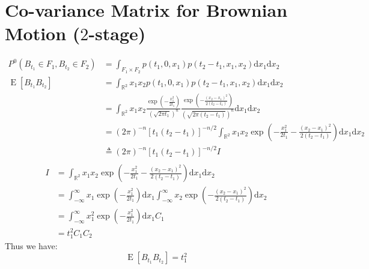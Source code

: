\documentclass[12pt]{article}
\begin{document}
\section{Co-variance Matrix for Brownian Motion ($2$-stage)}
\begin{align*}
    P^0(B_{t_1} \in F_1, B_{t_2} \in F_2) & =  \int_{F_1 \times F_2} p(t_1, 0, x_1) p(t_2-t_1, x_1, x_2) \mathrm{d}x_{1} \mathrm{d}x_2 \\
    \operatorname{E}[B_{t_1} B_{t_2}]     & =  \int_{\mathbb{R}^2} x_1 x_2 p(t_1, 0, x_1) p(t_2-t_1, x_1, x_2) \mathrm{d}x_{1} \mathrm{d}x_2 \\
    &= \int_{\mathbb{R}^2} x_1 x_2 \frac{\exp \left(-\frac{x_1^2}{2 t_1}\right)}{(\sqrt{2 \pi t_1})^{n} } \frac{\exp \left(-\frac{(x_2-x_1)^2}{2 (t_2-t_1)}\right)}{(\sqrt{2 \pi (t_2-t_1)})^{n} } \mathrm{d}x_{1} \mathrm{d}x_2 \\
    &= (2\pi)^{-n} [t_1(t_2-t_1)]^{-n/2} \int_{\mathbb{R}^2} x_1 x_2 \exp \left(-\frac{x_1^2}{2 t_1}-\frac{(x_2-x_1)^2}{2 (t_2-t_1)}\right) \mathrm{d}x_{1} \mathrm{d}x_2 \\
    &\triangleq (2\pi)^{-n} [t_1(t_2-t_1)]^{-n/2} I \\
\end{align*}
\begin{align*}
    I &= \int_{\mathbb{R}^2} x_1 x_2 \exp \left(-\frac{x_1^2}{2 t_1}-\frac{(x_2-x_1)^2}{2 (t_2-t_1)}\right) \mathrm{d}x_{1} \mathrm{d}x_2 \\
    &= \int_{-\infty}^{\infty} x_1 \exp \left(-\frac{x_1^2}{2 t_1}\right) \mathrm{d}x_1 \int_{-\infty}^{\infty} x_2 \exp \left(-\frac{(x_2-x_1)^2}{2 (t_2-t_1)}\right) \mathrm{d}x_2 \\
    &= \int_{-\infty}^{\infty} x_1^2 \exp \left(-\frac{x_1^2}{2 t_1}\right) \mathrm{d}x_1 C_1 \\
    &= t_1^2 C_1 C_2
\end{align*}
Thus we have:
\begin{equation}
    \operatorname{E}[B_{t_1} B_{t_2}] = t_1^2
\end{equation}
\end{document}
